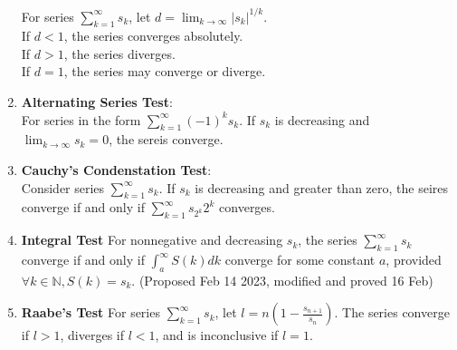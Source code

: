 \documentclass[../note.tex]{subfiles}
\begin{document}
\begin{theorem}
\begin{enumerate}
		For series $\sum^{\infty}_{k=1}s_k$, let $d=\lim_{k \to \infty} |s_k|^{1/k}$.\\
		If $d<1$, the series converges absolutely.\\
		If $d>1$, the series diverges.\\
		If $d=1$, the series may converge or diverge.
	\item \textbf{Alternating Series Test}: \label{AlternatingSeriesTest}\\
		For series in the form $\sum^{\infty}_{k=1}(-1)^{k}s_k$. If $s_k$ is decreasing and $\lim_{k\to \infty} s_k = 0$, the sereis converge. 
	\item \label{Cauchy_Condensation_Test} \textbf{Cauchy's Condenstation Test}:\\
		Consider series $\sum^{\infty}_{k=1}s_k$. If ${s_k}$ is decreasing and greater than zero, the seires converge if and only if $\sum^{\infty}_{k=1}s_{2^k}2^k $ converges. 
	\item \textbf{Integral Test}\label{IntegralTest}
		For nonnegative and decreasing $s_k$, the series $\sum^{\infty}_{k=1}s_k$ converge if and only if $\int_{a}^{\infty}S(k)dk$ converge for some constant $a$, provided $\forall k \in \mathbb{N}, S(k)=s_k$.
		(Proposed Feb 14 2023, modified and proved 16 Feb)
	\item \textbf{Raabe's Test}\label{Raabe's Test}
		For series $\sum^{\infty}_{k=1}s_k$, let $l= \displaystyle n\left(1-\frac{s_{n+1}}{s_n}\right)$. The series converge if $l>1$, diverges if $l<1$, and is inconclusive if $l=1$.

\end{enumerate}
\end{theorem}
\end{document}
